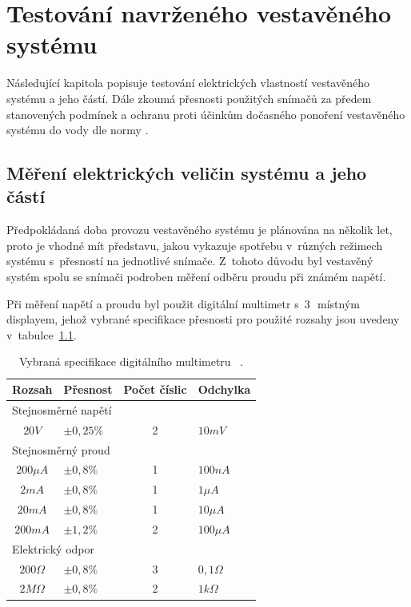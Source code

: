 \chapter{Testování navrženého vestavěného systému}
    Následující kapitola popisuje testování elektrických vlastností vestavěného systému a jeho částí. Dále zkoumá přesnosti použitých snímačů za předem stanovených podmínek a ochranu proti účinkům dočasného ponoření vestavěného systému do vody dle normy .

    \section{Měření elektrických veličin systému a jeho částí}
        Předpokládaná doba provozu vestavěného systému je plánována na několik let, proto je vhodné mít představu, jakou vykazuje spotřebu v~různých režimech systému s~přesností na jednotlivé snímače. Z~tohoto důvodu byl vestavěný systém spolu se snímači podroben měření odběru proudu při známém napětí.

        Při měření napětí a proudu byl použit digitální multimetr  s~3\,\textonehalf\ místným displayem, jehož vybrané specifikace přesnosti pro použité rozsahy jsou uvedeny v~tabulce~\ref{table:dmm}.
        \begin{table}[h]\centering
            \begin{tabular}{@{}clcl@{}}
                \toprule
                \phantom{abcab}\textbf{Rozsah}\phantom{abcab}& \textbf{Přesnost} & \textbf{Počet číslic}& \textbf{Odchylka}\\
                \midrule
                \multicolumn{4}{l}{Stejnosměrné napětí}\\
                $20\unit{V}$        & $\pm0,25\unit{\%}$    & 2 & $10\unit{mV}$\\
                \multicolumn{4}{l}{Stejnosměrný proud}\\
                $200\unit{\mu A}$   & $\pm0,8\unit{\%}$     & 1 & $100\unit{nA}$\\
                $2\unit{mA}$        & $\pm0,8\unit{\%}$     & 1 & $1\unit{\mu A}$\\
                $20\unit{mA}$       & $\pm0,8\unit{\%}$     & 1 & $10\unit{\mu A}$\\
                $200\unit{mA}$      & $\pm1,2\unit{\%}$     & 2 & $100\unit{\mu A}$\\
                \multicolumn{4}{l}{Elektrický odpor}\\
                $200\unit{\Omega}$  & $\pm0,8\unit{\%}$     & 3 & $0,1\unit{\Omega}$\\
                $2\unit{M\Omega}$   & $\pm0,8\unit{\%}$     & 2 & $1\unit{k\Omega}$\\
                \bottomrule
            \end{tabular}
            \caption{Vybraná specifikace digitálního multimetru ~\cite{dmm}.}
            \label{table:dmm}
        \end{table}

